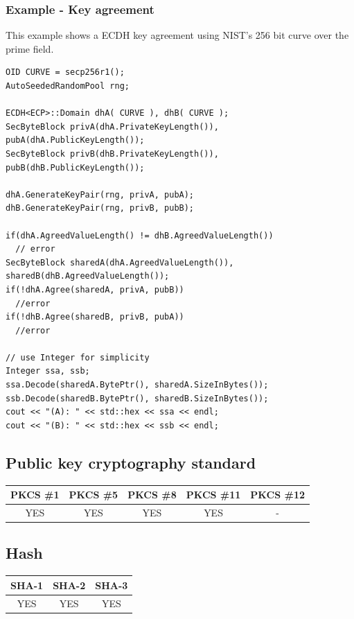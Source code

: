 \subsubsection*{Example - Key agreement}
This example shows a ECDH key agreement using NIST's 256 bit curve over the prime field.
\begin{verbatim}
OID CURVE = secp256r1();
AutoSeededRandomPool rng;

ECDH<ECP>::Domain dhA( CURVE ), dhB( CURVE );
SecByteBlock privA(dhA.PrivateKeyLength()), pubA(dhA.PublicKeyLength());
SecByteBlock privB(dhB.PrivateKeyLength()), pubB(dhB.PublicKeyLength());

dhA.GenerateKeyPair(rng, privA, pubA);
dhB.GenerateKeyPair(rng, privB, pubB);

if(dhA.AgreedValueLength() != dhB.AgreedValueLength())
  // error
SecByteBlock sharedA(dhA.AgreedValueLength()), sharedB(dhB.AgreedValueLength());
if(!dhA.Agree(sharedA, privA, pubB))
  //error
if(!dhB.Agree(sharedB, privB, pubA))
  //error

// use Integer for simplicity
Integer ssa, ssb;
ssa.Decode(sharedA.BytePtr(), sharedA.SizeInBytes());
ssb.Decode(sharedB.BytePtr(), sharedB.SizeInBytes());
cout << "(A): " << std::hex << ssa << endl;
cout << "(B): " << std::hex << ssb << endl;

\end{verbatim}
\newpage
\subsection{Public key cryptography standard}
\begin{table}[!ht]
	\begin{tabular}{|| c | c | c | c | c ||}
		\textbf{PKCS \#1} & \textbf{PKCS \#5} & \textbf{PKCS \#8}  & \textbf{PKCS \#11} & \textbf{PKCS \#12} \\
		\hline \hline
		YES & YES & YES & YES & - \\
	\end{tabular}
\end{table}

\subsection{Hash}
\begin{table}[!ht]
	\begin{tabular}{|| c | c | c ||}
		\textbf{SHA-1} & \textbf{SHA-2} & \textbf{SHA-3} \\
		\hline \hline
		YES & YES & YES \\
	\end{tabular}
\end{table}

